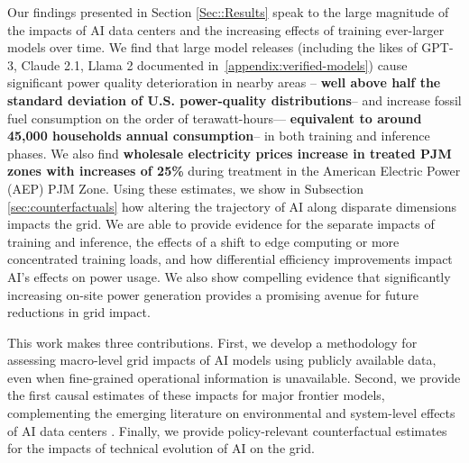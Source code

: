 \documentclass[sigconf,authordraft]{acmart}
\newcommand{\nb}[1]{\textcolor{blue}{NB[#1]}}
\newcommand{\aruna}[1]{\textcolor{blue}{Aruna[#1]}}
\begin{document}
Our findings presented in Section \ref{Sec::Results} speak to the large magnitude of the impacts of AI data centers and the increasing effects of training ever-larger models over time. We find that large model releases (including the likes of GPT-3, Claude 2.1, Llama 2 documented in~\autoref{appendix:verified-models}) 
cause significant power quality deterioration in nearby areas -- \textbf{well above half the standard deviation of U.S. power-quality distributions}-- and increase fossil fuel consumption on the order of terawatt-hours--- \textbf{equivalent to around 45,000 households annual consumption}-- in both training and inference phases. We also find \textbf{wholesale electricity prices increase in treated PJM zones with increases of 25\%} during treatment in the American Electric Power (AEP) PJM Zone.
Using these estimates, we show in Subsection \ref{sec:counterfactuals} how altering the trajectory of AI along disparate dimensions impacts the grid. We are able to provide evidence for the separate impacts of training and inference, the effects of a shift to edge computing or more concentrated training loads, and how differential efficiency improvements impact AI's effects on power usage. We also show compelling evidence that significantly increasing on-site power generation provides a promising avenue for future reductions in grid impact.

This work makes three contributions. First, we develop a methodology for assessing macro-level grid impacts of AI models using publicly available data, even when fine-grained operational information is unavailable. Second, we provide the first causal estimates of these impacts for major frontier models, complementing the emerging literature on environmental and system-level effects of AI data centers \cite{murino2023sustainable, guidi2024environmental, thangam2024impact}. Finally, we provide policy-relevant counterfactual estimates for the impacts of technical evolution of AI on the grid.

\end{document}
